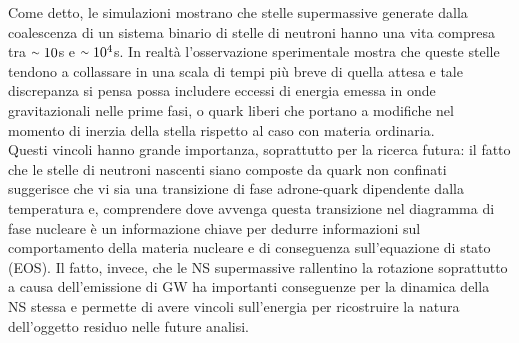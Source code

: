 Come detto, le simulazioni mostrano che stelle supermassive generate dalla coalescenza di un sistema binario di stelle di neutroni hanno una vita compresa tra $\smallsim10$s e $\smallsim10^4$s. In realtà l'osservazione sperimentale mostra che queste stelle tendono a collassare in una scala di tempi più breve di quella attesa e tale discrepanza si pensa possa includere eccessi di energia emessa in onde gravitazionali nelle prime fasi, o quark liberi che portano a modifiche nel momento di inerzia della stella rispetto al caso con materia ordinaria\cite{sarin2020evolution}.\\
Questi vincoli hanno grande importanza, soprattutto per la ricerca futura: il fatto che le stelle di neutroni nascenti siano composte da quark non confinati suggerisce che vi sia una transizione di fase adrone-quark dipendente dalla temperatura e, comprendere dove avvenga questa transizione nel diagramma di fase nucleare è un informazione chiave per dedurre informazioni sul comportamento della materia nucleare e di conseguenza sull'equazione di stato (EOS).
Il fatto, invece, che le NS supermassive rallentino la rotazione soprattutto a causa dell'emissione di GW ha importanti conseguenze per la dinamica della NS stessa e permette di avere vincoli sull'energia per ricostruire la natura dell'oggetto residuo nelle future analisi\cite{sarin2020evolution}.

